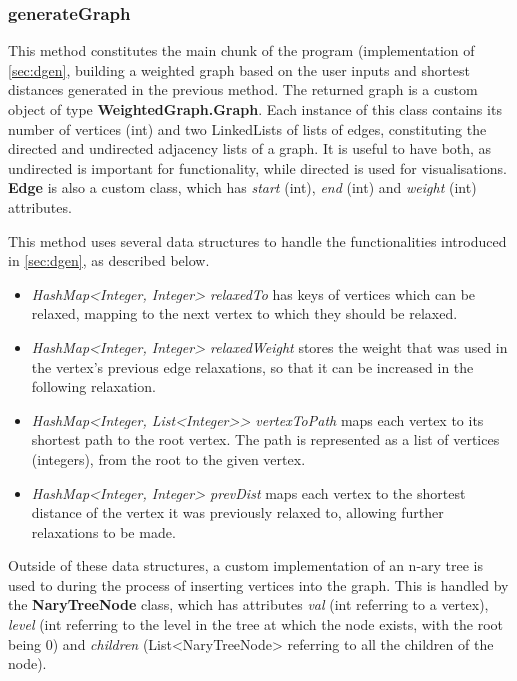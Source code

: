 \documentclass{l4proj}
\begin{document}
\subsubsection{generateGraph}

This method constitutes the main chunk of the program (implementation of \autoref{sec:dgen}, building a weighted graph based on the user inputs and shortest distances generated in the previous method. The returned graph is a custom object of type \textbf{WeightedGraph.Graph}. Each instance of this class contains its number of vertices (int) and two LinkedLists of lists of edges, constituting the directed and undirected adjacency lists of a graph. It is useful to have both, as undirected is important for functionality, while directed is used for visualisations. \textbf{Edge} is also a custom class, which has \emph{start} (int), \emph{end} (int) and \emph{weight} (int) attributes.

This method uses several data structures to handle the functionalities introduced in \autoref{sec:dgen}, as described below.
\begin{itemize}
	\item
	\emph{HashMap<Integer, Integer> relaxedTo} has keys of vertices which can be relaxed, mapping to the next vertex to which they should be relaxed.
	\item
	\emph{HashMap<Integer, Integer> relaxedWeight} stores the weight that was used in the vertex's previous edge relaxations, so that it can be increased in the following relaxation.
	\item
	\emph{HashMap<Integer, List<Integer>> vertexToPath} maps each vertex to its shortest path to the root vertex. The path is represented as a list of vertices (integers), from the root to the given vertex.
	\item
	\emph{HashMap<Integer, Integer> prevDist} maps each vertex to the shortest distance of the vertex it was previously relaxed to, allowing further relaxations to be made.
\end{itemize}

Outside of these data structures, a custom implementation of an n-ary tree is used to during the process of inserting vertices into the graph. This is handled by the \textbf{NaryTreeNode} class, which has attributes \emph{val} (int referring to a vertex), \emph{level} (int referring to the level in the tree at which the node exists, with the root being $0$) and \emph{children} (List<NaryTreeNode> referring to all the children of the node). 
\end{document}
